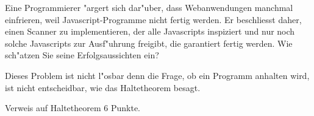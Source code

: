 Eine Programmierer "argert sich dar"uber, dass Webanwendungen manchmal
einfrieren, weil Javascript-Programme nicht fertig werden.
Er beschliesst daher, einen Scanner zu implementieren, der alle
Java\-scripts inspiziert und nur noch solche Javascripts zur Ausf"uhrung
freigibt, die garantiert fertig werden. Wie sch"atzen Sie seine
Erfolgsaussichten ein?

\begin{loesung}
Dieses Problem ist nicht l"osbar denn die Frage, ob ein Programm 
anhalten wird, ist nicht entscheidbar, wie das Haltetheorem besagt.
\end{loesung}

\begin{bewertung}
Verweis auf Haltetheorem 6 Punkte.
\end{bewertung}
